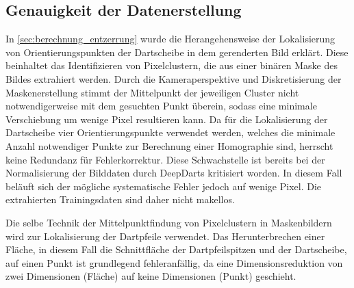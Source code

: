 
\vspace*{-0.2cm}
\subsection{Genauigkeit der Datenerstellung}

In \autoref{sec:berechnung_entzerrung} wurde die Herangehensweise der Lokalisierung von Orientierungspunkten der Dartscheibe in dem gerenderten Bild erklärt. Diese beinhaltet das Identifizieren von Pixelclustern, die aus einer binären Maske des Bildes extrahiert werden. Durch die Kameraperspektive und Diskretisierung der Maskenerstellung stimmt der Mittelpunkt der jeweiligen Cluster nicht notwendigerweise mit dem gesuchten Punkt überein, sodass eine minimale Verschiebung um wenige Pixel resultieren kann. Da für die Lokalisierung der Dartscheibe vier Orientierungspunkte verwendet werden, welches die minimale Anzahl notwendiger Punkte zur Berechnung einer Homographie sind, herrscht keine Redundanz für Fehlerkorrektur. Diese Schwachstelle ist bereits bei der Normalisierung der Bilddaten durch DeepDarts kritisiert worden. In diesem Fall beläuft sich der mögliche systematische Fehler jedoch auf wenige Pixel. Die extrahierten Trainingsdaten sind daher nicht makellos.

Die selbe Technik der Mittelpunktfindung von Pixelclustern in Maskenbildern wird zur Lokalisierung der Dartpfeile verwendet. Das Herunterbrechen einer Fläche, in diesem Fall die Schnittfläche der Dartpfeilspitzen und der Dartscheibe, auf einen Punkt ist grundlegend fehleranfällig, da eine Dimensionsreduktion von zwei Dimensionen (Fläche) auf keine Dimensionen (Punkt) geschieht.


